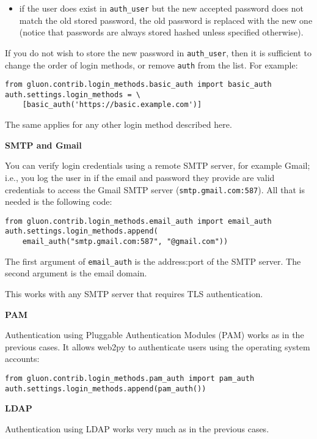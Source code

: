 \documentclass[justified,sixbynine,notoc]{tufte-book}
\def\ft{\small\tt}
\def\inxx#1{\index{#1}}
\begin{document}
\begin{fullwidth}
\begin{itemize}
\item if the user does exist in {\ft auth\_user} but the new accepted password does not match the old stored password, the old password is replaced with the new one (notice that passwords are always stored hashed unless specified otherwise).
\end{itemize}

If you do not wish to store the new password in {\ft auth\_user}, then it is sufficient to change the order of login methods, or remove {\ft auth} from the list. For example:
\begin{lstlisting}
from gluon.contrib.login_methods.basic_auth import basic_auth
auth.settings.login_methods = \
    [basic_auth('https://basic.example.com')]
\end{lstlisting}

The same applies for any other login method described here.

{\bf SMTP and Gmail}

\inxx{SMTP} \inxx{Gmail}

You can verify login credentials using a remote SMTP server, for example Gmail; i.e., you log the user in if the email and password they provide are valid credentials to access the Gmail SMTP server ({\ft smtp.gmail.com:587}). All that is needed is the following code:
\begin{lstlisting}
from gluon.contrib.login_methods.email_auth import email_auth
auth.settings.login_methods.append(
    email_auth("smtp.gmail.com:587", "@gmail.com"))
\end{lstlisting}

The first argument of {\ft email\_auth} is the address:port of the SMTP server. The second argument is the email domain.

This works with any SMTP server that requires TLS authentication.\inxx{TLS}

{\bf PAM}

\inxx{PAM}

Authentication using Pluggable Authentication Modules (PAM) works as in the previous cases. It allows web2py to authenticate users using the operating system accounts:
\begin{lstlisting}
from gluon.contrib.login_methods.pam_auth import pam_auth
auth.settings.login_methods.append(pam_auth())
\end{lstlisting}

{\bf LDAP}

\inxx{LDAP}

Authentication using LDAP works very much as in the previous cases.


\end{fullwidth}
\end{document}
